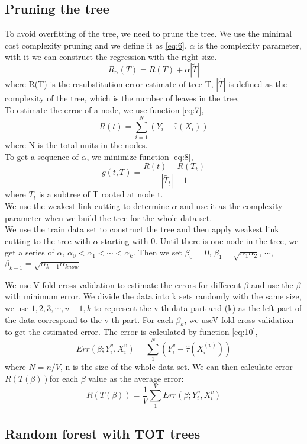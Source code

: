 \subsection{Pruning the tree}

To avoid overfitting of the tree, we need to prune the tree. We use the minimal cost complexity pruning and we define it as \ref{eq:6}. $\alpha$ is the complexity parameter, with it we can construct the regression with the right size.
\begin{equation}\label{eq:6}
R_{\alpha}(T) = R(T) + \alpha \left|\tilde{T}\right|
\end{equation}
where R(T) is the resubstitution error estimate of tree T, $\left|\tilde{T}\right|$ is defined as the complexity of the tree, which is the number of leaves in the tree,\\
To estimate the error of a node, we use function \ref{eq:7},
\begin{equation}\label{eq:7}
R(t) = \sum_{i=1}^{N}(Y_{i} - \hat{\tau}(X_{i}))
\end{equation}
where N is the total units in the nodes. \\

To get a sequence of $\alpha$, we minimize function \ref{eq:8},
\begin{equation}\label{eq:8}
g(t,T) = \frac{R(t) - R(T_{t})}{\left|\tilde{T_{t}}\right| - 1}
\end{equation}
where $T_{t}$ is a subtree of T rooted at node t.\\
We use the weakest link cutting to determine $\alpha$ and use it as the complexity parameter when we build the tree for the whole data set. \\
We use the train data set to construct the tree and then apply weakest link cutting to the tree with $\alpha$ starting with 0. Until there is one node in the tree, we get a series of
$\alpha$, $ \alpha_{0} < \alpha_{1} < \cdots < \alpha_{k}$.
Then we set $\beta_{0} $ = 0, $\beta_{1} = \sqrt{\alpha_{1}\alpha_{2}}$, $\cdots $, $\beta_{k-1} = \sqrt{\alpha_{k-1}\alpha_{know}}$

We use V-fold cross validation to estimate the errors for different $\beta$ and use the $\beta$ with minimum error.
We divide the data into k sets randomly with the same size, we use $1,2,3,\cdots,v-1,k$ to represent the v-th data part and (k) as the left part of the data correspond to the v-th part. For each $\beta_{k}$, we useV-fold cross validation to get the estimated error. The error is calculated by function \ref{eq:10},
 \begin{equation}\label{eq:10}
Err(\beta;Y_{i}^{v}, X_{i}^{v}) =  \sum_{1}^{N}(Y_{i}^{v} - \hat{\tau}(X_{i}^{(v)}))
\end{equation}
where $N = n/V$, n is the size of the whole data set. 
We can then calculate error $R(T(\beta)) $for each $\beta$ value as the average error:
\begin{equation}\label{eq:9}
R(T(\beta)) = \frac{1}{V}\sum_{1}^{V}Err(\beta;Y_{i}^{v}, X_{i}^{v})
\end{equation}

\subsection{Random forest with TOT trees}











